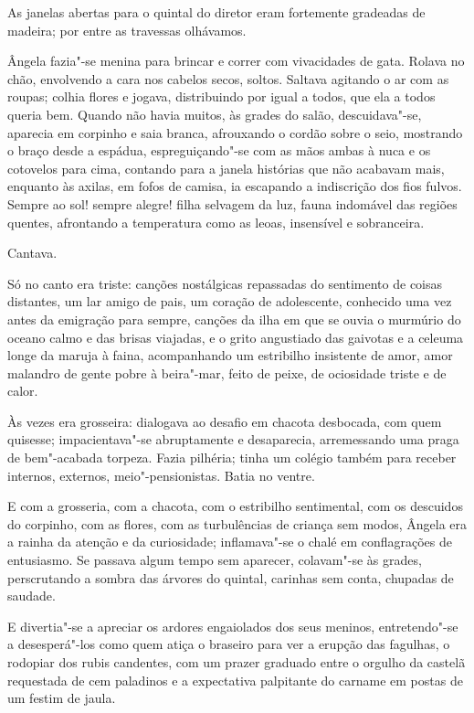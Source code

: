 As janelas abertas para o quintal do diretor eram
fortemente gradeadas de madeira; por entre as travessas olhávamos.

Ângela fazia"-se menina para brincar e correr com vivacidades de gata.
Rolava no chão, envolvendo a cara nos cabelos secos, soltos. Saltava
agitando o ar com as roupas; colhia flores e jogava, distribuindo por
igual a todos, que ela a todos queria bem. Quando não havia muitos, às
grades do salão, descuidava"-se, aparecia em corpinho e saia branca,
afrouxando o cordão sobre o seio, mostrando o braço desde a espádua,
espreguiçando"-se com as mãos ambas à nuca e os cotovelos para cima,
contando para a janela histórias que não acabavam mais, enquanto às
axilas, em fofos de camisa, ia escapando a indiscrição dos fios fulvos.
Sempre ao sol! sempre alegre! filha selvagem da luz, fauna indomável
das regiões quentes, afrontando a temperatura como as leoas, insensível
e sobranceira. 

Cantava. 

Só no canto era triste: canções nostálgicas
repassadas do sentimento de coisas distantes, um lar amigo de pais, um
coração de adolescente, conhecido uma vez antes da emigração para
sempre, canções da ilha em que se ouvia o murmúrio do oceano calmo e
das brisas viajadas, e o grito angustiado das gaivotas e a celeuma
longe da maruja à faina, acompanhando um estribilho insistente de amor,
amor malandro de gente pobre à beira"-mar, feito de peixe, de
ociosidade triste e de calor. 

Às vezes era grosseira: dialogava ao
desafio em chacota desbocada, com quem quisesse; impacientava"-se
abruptamente e desaparecia, arremessando uma praga de bem"-acabada
torpeza. Fazia pilhéria; tinha um colégio também para receber internos,
externos, meio"-pensionistas. Batia no ventre. 

E com a grosseria, com a chacota, com o estribilho sentimental,
com os descuidos do corpinho, com as flores, com as turbulências de
criança sem modos, Ângela era a rainha da atenção e da curiosidade;
inflamava"-se o chalé em conflagrações de entusiasmo. Se passava algum
tempo sem aparecer, colavam"-se às grades, perscrutando a sombra das
árvores do quintal, carinhas sem conta, chupadas de saudade. 

E divertia"-se a apreciar os ardores engaiolados dos seus meninos,
entretendo"-se a desesperá"-los como quem atiça o braseiro para ver a
erupção das fagulhas, o rodopiar dos rubis candentes, com um prazer
graduado entre o orgulho da castelã requestada de cem paladinos e a
expectativa palpitante do carname em postas de um festim de jaula. 

